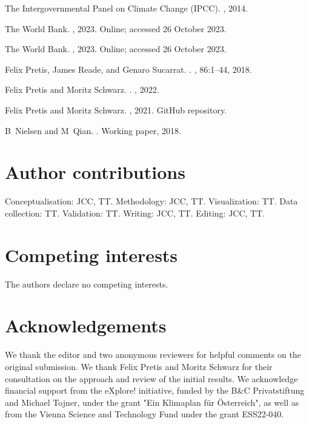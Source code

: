 \documentclass[a4paper]{article}
\begin{document}
\begin{thebibliography}{10}
{The Intergovernmental Panel on Climate Change (IPCC)}.
, 2014.

{The World Bank}.
, 2023.
\newblock Online; accessed 26 October 2023.

{The World Bank}.
, 2023.
\newblock Online; accessed 26 October 2023.

Felix Pretis, James Reade, and Genaro Sucarrat.
.
, 86:1--44, 2018.

Felix Pretis and Moritz Schwarz.
.
, 2022.

Felix Pretis and Moritz Schwarz.
, 2021.
\newblock GitHub repository.

B~Nielsen and M~Qian.
.
\newblock Working paper, 2018.

\end{thebibliography}


\section*{Author contributions}
Conceptualisation: JCC, TT. Methodology: JCC, TT. Visualization: TT. Data collection: TT. Validation: TT. Writing: JCC, TT. Editing: JCC, TT.

\section*{Competing interests}
The authors declare no competing interests.

\section*{Acknowledgements}
We thank the editor and two anonymous reviewers for helpful comments on the original submission. We thank Felix Pretis and Moritz Schwarz for their consultation on the approach and review of the initial results. We acknowledge financial support from the eXplore! initiative, funded by the B\&C Privatstiftung and Michael Tojner, under the grant "Ein Klimaplan für Österreich", as well as from the Vienna Science and Technology Fund under the grant ESS22-040.
\end{document}
